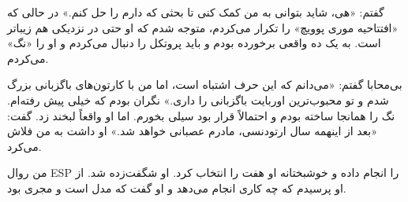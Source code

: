 گفتم: «هی، شاید بتوانی به من کمک کنی تا بحثی که دارم را حل کنم.» در حالی که «افتتاحیه موری پوویچ» را تکرار می‌کردم، متوجه شدم که او حتی در نزدیکی هم زیباتر است. به یک ده واقعی برخورده بودم و باید پروتکل را دنبال می‌کردم و او را «نگ» می‌کردم. 

بی‌محابا گفتم: «می‌دانم که این حرف اشتباه است، اما من با کارتون‌های باگزبانی بزرگ شدم و تو محبوب‌ترین اوربایت باگزبانی را داری.» نگران بودم که خیلی پیش رفته‌ام. نگ را همانجا ساخته بودم و احتمالاً قرار بود سیلی بخورم. اما او واقعاً لبخند زد. گفت: «بعد از اینهمه سال ارتودنسی، مادرم عصبانی خواهد شد.» او داشت به من فلاش می‌کرد. 

من روال ESP را انجام داده و خوشبختانه او هفت را انتخاب کرد. او شگفت‌زده شد. از او پرسیدم که چه کاری انجام می‌دهد و او گفت که مدل است و مجری بود.